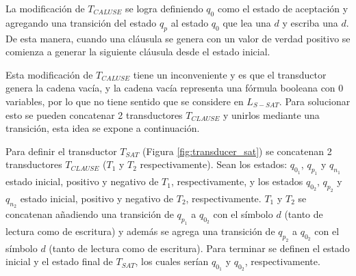 \documentclass[12pt]{article}
\begin{document}
La modificación de $T_{CALUSE}$ se logra definiendo $q_0$ como el estado de aceptación y agregando una transición del estado $q_p$ al estado $q_0$ que lea una $d$ y escriba una $d$. De esta manera, cuando una cláusula se genera con un valor de verdad positivo se comienza a generar la siguiente cláusula desde el estado inicial.

Esta modificación de $T_{CALUSE}$ tiene un inconveniente y es que el transductor genera la cadena vacía, y la cadena vacía representa una fórmula booleana con 0 variables, por lo que no tiene sentido que se considere en $L_{S-SAT}$. Para solucionar esto se pueden concatenar 2 transductores $T_{CLAUSE}$ y unirlos mediante una transición, esta idea se expone a continuación.

Para definir el transductor $T_{SAT}$ (Figura \ref{fig:transducer_sat}) se concatenan 2 transductores
$T_{CLAUSE}$ ($T_1$ y $T_2$ respectivamente). Sean los estados: $q_{0_1}$, $q_{p_1}$ y $q_{n_1}$ estado inicial,
positivo y negativo de $T_1$, respectivamente, y los estados $q_{0_2}$, $q_{p_2}$ y $q_{n_2}$ estado inicial,
positivo y negativo de $T_2$, respectivamente. $T_1$ y $T_2$ se concatenan añadiendo una transición de $q_{p_1}$ a $q_{0_2}$ con el símbolo $d$ (tanto de lectura como de escritura) y además se agrega una transición de $q_{p_2}$ a $q_{0_2}$ con el símbolo $d$ (tanto de lectura como de escritura).  Para terminar se definen el estado inicial y el estado final de $T_{SAT}$, los cuales serían $q_{0_1}$ y $q_{0_2}$, respectivamente.
\end{document}
